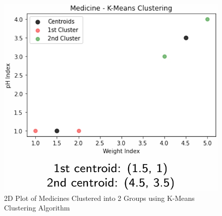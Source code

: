 \documentclass{book}
\begin{document}
\begin{figure}[h]
    \centering
    \includegraphics[scale=0.4]{chapter 5/ch5_figure17.jpeg}
    \caption{2D Plot of Medicines Clustered into 2 Groups using K-Means Clustering Algorithm}
\end{figure}
\end{document}

